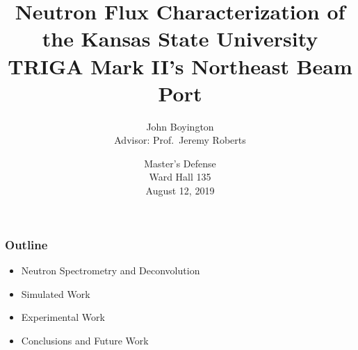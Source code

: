 \documentclass[fleqn]{beamer}
\title[KSU Beam Characterization]{Neutron Flux Characterization of the Kansas State University TRIGA Mark II's Northeast Beam Port}
\author[John Boyington]{
    John Boyington\\
    Advisor: Prof.~Jeremy Roberts}
\institute[Kansas State University]{
    Department of Mechanical and Nuclear Engineering \\
    Kansas State University}
\date[Master's Defense]{
    Master's Defense\\
    Ward Hall 135\\
    August 12, 2019}
\begin{document}
\newcommand{\beginbackup}{
    \newcounter{framenumbervorappendix}
    \setcounter{framenumbervorappendix}{\value{framenumber}}
}
\newcommand{\backupend}{
    \addtocounter{framenumbervorappendix}{-\value{framenumber}}
    \addtocounter{framenumber}{\value{framenumbervorappendix}}
}



\begin{frame}
\titlepage
\end{frame}

\begin{frame}
\frametitle{Outline}
\begin{itemize}
\item Neutron Spectrometry and Deconvolution
\item Simulated Work
\item Experimental Work
\item Conclusions and Future Work
\end{itemize}
\end{frame}

\end{document}
